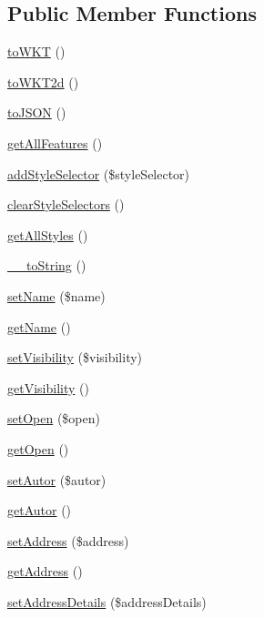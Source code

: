 \subsection*{Public Member Functions}
\begin{DoxyCompactItemize}
\item 
\hyperlink{classFeature_a8aa7faa65ae071f795a2d2b963fe795d}{toWKT} ()
\item 
\hyperlink{classFeature_a3339c1d26a4ac98fd4b92112c508fcca}{toWKT2d} ()
\item 
\hyperlink{classFeature_ada3e23a907b730daa54091f9700123c0}{toJSON} ()
\item 
\hyperlink{classFeature_a993ca116ab97060a5619a9c87f39fb12}{getAllFeatures} ()
\item 
\hyperlink{classFeature_a9f8bcf8a58b02fe970b80565f59dd0b4}{addStyleSelector} (\$styleSelector)
\item 
\hyperlink{classFeature_a13bde7b072baa1842dc40e45f656d968}{clearStyleSelectors} ()
\item 
\hyperlink{classFeature_a60d19a1edb53517bc74b7a30f0a88376}{getAllStyles} ()
\item 
\hyperlink{classFeature_a9a910474b67717a33f951f14fc8c5ba2}{\_\-\_\-toString} ()
\item 
\hyperlink{classFeature_abac51f55e0868d2a9beaa226ec01fb17}{setName} (\$name)
\item 
\hyperlink{classFeature_a26981df5dc43b19392a7be591769bbb5}{getName} ()
\item 
\hyperlink{classFeature_aad4601185c54bc3bf19659387f7fa73f}{setVisibility} (\$visibility)
\item 
\hyperlink{classFeature_a623049cd1efa09c6b5c030bd38c721b0}{getVisibility} ()
\item 
\hyperlink{classFeature_af1960ac6192ccce4e0fcb73ce7c21cc0}{setOpen} (\$open)
\item 
\hyperlink{classFeature_ad5ee05aa541a8d62f0329b1cead42f5a}{getOpen} ()
\item 
\hyperlink{classFeature_af686944d2394cbad1f402f59cfb1d4be}{setAutor} (\$autor)
\item 
\hyperlink{classFeature_a62e35e446eb29aa2ab4586ce48f09c04}{getAutor} ()
\item 
\hyperlink{classFeature_aca02429af233d54b022553112d56edab}{setAddress} (\$address)
\item 
\hyperlink{classFeature_aacc4ef608015241ffff1dacfeccc09bc}{getAddress} ()
\item 
\hyperlink{classFeature_a7eecbdf3c6896c58d2d1b9cded0cc6ef}{setAddressDetails} (\$addressDetails)

\end{DoxyCompactItemize}
